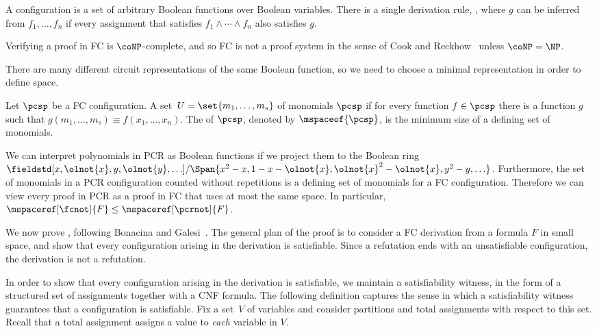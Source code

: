 \begin{definition}
  \label{def:fc}
A  configuration is a set of arbitrary Boolean functions over Boolean variables. There is a single derivation rule, , where $g$ can be inferred from $f_1,\ldots,f_n$ if every assignment that satisfies $f_1\land\cdots\land f_n$ also satisfies $g$.
\end{definition}

Verifying a proof in FC is $\coNP$-complete, and so FC is not a proof system in the sense of Cook and Reckhow~\cite{CR79Relative} unless $\coNP = \NP$.

There are many different circuit representations of the same Boolean function, so we need to choose a minimal representation in order to define space.

\begin{definition}
  \label{def:fcspace}
  Let $\pcsp$ be a FC configuration. A %
  set~$U=\set{m_1,\ldots,m_s}$ of monomials
   $\pcsp$ if for every function $f\in\pcsp$ there is a function $g$ such that $g(m_1,\ldots,m_s)\equiv f(x_1,\ldots,x_n)$. The  of $\pcsp$, denoted by $\mspaceof{\pcsp}$, is the minimum size of a %
  defining set of monomials.
\end{definition}

We can interpret polynomials in PCR as Boolean functions if we project them to the Boolean ring $\fieldstd[x,\olnot{x}, y, \olnot{y}, \ldots]/\Span{x^2-x,1-x-\olnot{x},\olnot{x}^2-\olnot{x},y^2-y,\ldots}$. Furthermore, the set of monomials in a PCR configuration counted without repetitions is a %
defining set of monomials
for a FC configuration. Therefore we can view every proof in PCR as a proof in FC that uses at most the same space. In particular, $\mspaceref[\fcnot]{F}\leq \mspaceref[\pcrnot]{F}$.

We now prove , following Bonacina and Galesi~\cite{BG15Framework}. The general plan of the proof is to consider a FC derivation from a formula $F$ in small space, and show that every configuration arising in the derivation is satisfiable. Since a refutation ends with an unsatisfiable configuration, the derivation is not a refutation.

In order to show that every configuration arising in the derivation is satisfiable, we maintain a satisfiability witness, in the form of a structured set of assignments together with a CNF formula.  The following definition captures the sense in which a satisfiability witness guarantees that a configuration is satisfiable. Fix a %
set~$V$ of variables
and consider partitions and total assignments with respect to this set.
Recall that a total assignment assigns a value to \emph{each} variable in $V$.

